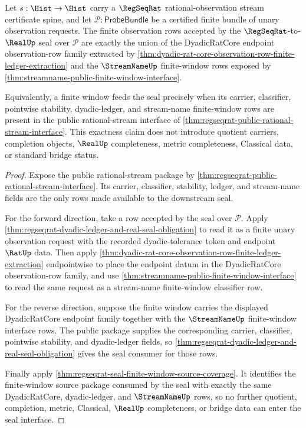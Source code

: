 \begin{theorem}
\label{thm:regseqrat-finite-window-seal-exactness}
Let $s:\Hist\to\Hist$ carry a $\RegSeqRat$ rational-observation stream
certificate spine, and let $\mathcal{P}:\mathsf{ProbeBundle}$ be a certified
finite bundle of unary observation requests. The finite observation rows
accepted by the $\RegSeqRat$-to-$\RealUp$ seal over $\mathcal{P}$ are exactly
the union of the DyadicRatCore endpoint observation-row family extracted by
\autoref{thm:dyadic-rat-core-observation-row-finite-ledger-extraction} and the
$\StreamNameUp$ finite-window rows exposed by
\autoref{thm:streamname-public-finite-window-interface}.

Equivalently, a finite window feeds the seal precisely when its carrier,
classifier, pointwise stability, dyadic-ledger, and stream-name finite-window
rows are present in the public rational-stream interface of
\autoref{thm:regseqrat-public-rational-stream-interface}. This exactness claim
does not introduce quotient carriers, completion objects, $\RealUp$
completeness, metric completeness, Classical data, or standard bridge status.
\end{theorem}
\begin{proof}
Expose the public rational-stream package by
\autoref{thm:regseqrat-public-rational-stream-interface}. Its carrier,
classifier, stability, ledger, and stream-name fields are the only rows made
available to the downstream seal.

For the forward direction, take a row accepted by the seal over
$\mathcal{P}$. Apply
\autoref{thm:regseqrat-dyadic-ledger-and-real-seal-obligation} to read it as a
finite unary observation request with the recorded dyadic-tolerance token and
endpoint $\RatUp$ data. Then apply
\autoref{thm:dyadic-rat-core-observation-row-finite-ledger-extraction}
endpointwise to place the endpoint datum in the DyadicRatCore observation-row
family, and use \autoref{thm:streamname-public-finite-window-interface} to read
the same request as a stream-name finite-window classifier row.

For the reverse direction, suppose the finite window carries the displayed
DyadicRatCore endpoint family together with the $\StreamNameUp$ finite-window
interface rows. The public package supplies the corresponding carrier,
classifier, pointwise stability, and dyadic-ledger fields, so
\autoref{thm:regseqrat-dyadic-ledger-and-real-seal-obligation} gives the seal
consumer for those rows.

Finally apply \autoref{thm:regseqrat-seal-finite-window-source-coverage}. It
identifies the finite-window source package consumed by the seal with exactly
the same DyadicRatCore, dyadic-ledger, and $\StreamNameUp$ rows, so no further
quotient, completion, metric, Classical, $\RealUp$ completeness, or bridge data
can enter the seal interface.
\end{proof}

